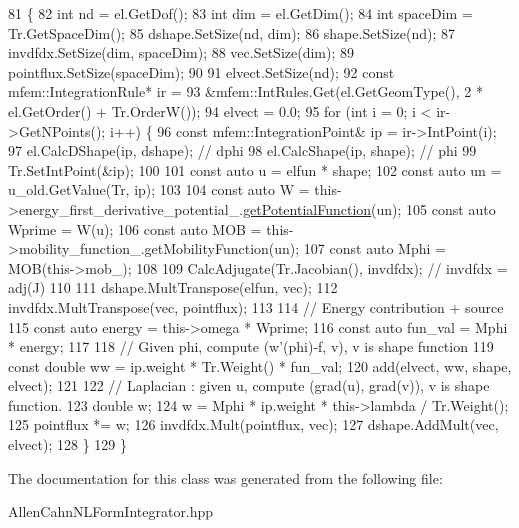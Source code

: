 \begin{DoxyCode}
81                         \{
82   \textcolor{keywordtype}{int} nd = el.GetDof();
83   \textcolor{keywordtype}{int} dim = el.GetDim();
84   \textcolor{keywordtype}{int} spaceDim = Tr.GetSpaceDim();
85   dshape.SetSize(nd, dim);
86   shape.SetSize(nd);
87   invdfdx.SetSize(dim, spaceDim);
88   vec.SetSize(dim);
89   pointflux.SetSize(spaceDim);
90 
91   elvect.SetSize(nd);
92   \textcolor{keyword}{const} mfem::IntegrationRule* ir =
93       &mfem::IntRules.Get(el.GetGeomType(), 2 * el.GetOrder() + Tr.OrderW());
94   elvect = 0.0;
95   \textcolor{keywordflow}{for} (\textcolor{keywordtype}{int} i = 0; i < ir->GetNPoints(); i++) \{
96     \textcolor{keyword}{const} mfem::IntegrationPoint& ip = ir->IntPoint(i);
97     el.CalcDShape(ip, dshape);  \textcolor{comment}{// dphi}
98     el.CalcShape(ip, shape);    \textcolor{comment}{// phi}
99     Tr.SetIntPoint(&ip);
100 
101     \textcolor{keyword}{const} \textcolor{keyword}{auto} u = elfun * shape;
102     \textcolor{keyword}{const} \textcolor{keyword}{auto} un = u\_old.GetValue(Tr, ip);
103 
104     \textcolor{keyword}{const} \textcolor{keyword}{auto} W = this->energy\_first\_derivative\_potential\_.\hyperlink{classPotentialFunctions_af7b46074a256a70b110ae621d0335874}{getPotentialFunction}(un);
105     \textcolor{keyword}{const} \textcolor{keyword}{auto} Wprime = W(u);
106     \textcolor{keyword}{const} \textcolor{keyword}{auto} MOB = this->mobility\_function\_.getMobilityFunction(un);
107     \textcolor{keyword}{const} \textcolor{keyword}{auto} Mphi = MOB(this->mob\_);
108 
109     CalcAdjugate(Tr.Jacobian(), invdfdx);  \textcolor{comment}{// invdfdx = adj(J)}
110 
111     dshape.MultTranspose(elfun, vec);
112     invdfdx.MultTranspose(vec, pointflux);
113 
114     \textcolor{comment}{// Energy contribution + source}
115     \textcolor{keyword}{const} \textcolor{keyword}{auto} energy = this->omega * Wprime;
116     \textcolor{keyword}{const} \textcolor{keyword}{auto} fun\_val = Mphi * energy;
117 
118     \textcolor{comment}{// Given phi, compute (w'(phi)-f, v), v is shape function}
119     \textcolor{keyword}{const} \textcolor{keywordtype}{double} ww = ip.weight * Tr.Weight() * fun\_val;
120     add(elvect, ww, shape, elvect);
121 
122     \textcolor{comment}{// Laplacian : given u, compute (grad(u), grad(v)), v is shape function.}
123     \textcolor{keywordtype}{double} w;
124     w = Mphi * ip.weight * this->lambda / Tr.Weight();
125     pointflux *= w;
126     invdfdx.Mult(pointflux, vec);
127     dshape.AddMult(vec, elvect);
128   \}
129 \}
\end{DoxyCode}


The documentation for this class was generated from the following file\+:\begin{DoxyCompactItemize}
\item 
Allen\+Cahn\+N\+L\+Form\+Integrator.\+hpp\end{DoxyCompactItemize}
